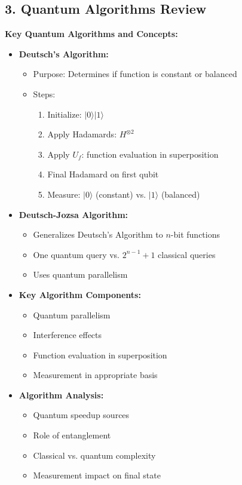 \documentclass{article}
\begin{document}
\subsection{3. Quantum Algorithms Review}
\textbf{Key Quantum Algorithms and Concepts:}
\begin{itemize}
    \item \textbf{Deutsch's Algorithm:}
        \begin{itemize}
            \item Purpose: Determines if function is constant or balanced
            \item Steps:
                \begin{enumerate}
                    \item Initialize: \(\lvert 0 \rangle \lvert 1 \rangle\)
                    \item Apply Hadamards: \(H^{\otimes 2}\)
                    \item Apply \(U_f\): function evaluation in superposition
                    \item Final Hadamard on first qubit
                    \item Measure: \(\lvert 0 \rangle\) (constant) vs. \(\lvert 1 \rangle\) (balanced)
                \end{enumerate}
        \end{itemize}
    \item \textbf{Deutsch-Jozsa Algorithm:}
        \begin{itemize}
            \item Generalizes Deutsch's Algorithm to \(n\)-bit functions
            \item One quantum query vs. \(2^{n-1}+1\) classical queries
            \item Uses quantum parallelism
        \end{itemize}
    \item \textbf{Key Algorithm Components:}
        \begin{itemize}
            \item Quantum parallelism
            \item Interference effects
            \item Function evaluation in superposition
            \item Measurement in appropriate basis
        \end{itemize}
    \item \textbf{Algorithm Analysis:}
        \begin{itemize}
            \item Quantum speedup sources
            \item Role of entanglement
            \item Classical vs. quantum complexity
            \item Measurement impact on final state
        \end{itemize}
\end{itemize}
\end{document}
